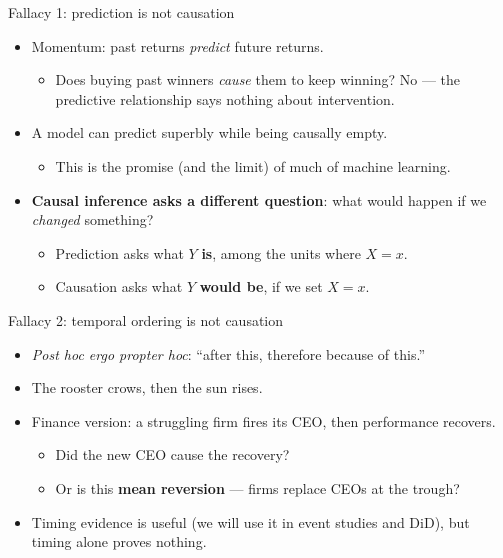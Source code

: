 \documentclass[
  11pt,
  ignorenonframetext,
  aspectratio=169,
]{beamer}
\providecommand{\tightlist}{%
  \setlength{\itemsep}{0pt}\setlength{\parskip}{0pt}}
\begin{document}
\begin{frame}{Fallacy 1: prediction is not causation}
\protect{}\label{fallacy-1-prediction-is-not-causation}
\begin{itemize}
\tightlist
\item
  Momentum: past returns \emph{predict} future returns.

  \begin{itemize}
  \tightlist
  \item
    Does buying past winners \emph{cause} them to keep winning? No ---
    the predictive relationship says nothing about intervention.
  \end{itemize}
\item
  A model can predict superbly while being causally empty.

  \begin{itemize}
  \tightlist
  \item
    This is the promise (and the limit) of much of machine learning.
  \end{itemize}
\item
  \textbf{Causal inference asks a different question}: what would happen
  if we \emph{changed} something?

  \begin{itemize}
  \tightlist
  \item
    Prediction asks what \(Y\) \textbf{is}, among the units where
    \(X = x\).
  \item
    Causation asks what \(Y\) \textbf{would be}, if we set \(X = x\).
  \end{itemize}
\end{itemize}
\end{frame}

\begin{frame}{Fallacy 2: temporal ordering is not causation}
\protect{}\label{fallacy-2-temporal-ordering-is-not-causation}
\begin{itemize}
\tightlist
\item
  \emph{Post hoc ergo propter hoc}: ``after this, therefore because of
  this.''
\item
  The rooster crows, then the sun rises.
\item
  Finance version: a struggling firm fires its CEO, then performance
  recovers.

  \begin{itemize}
  \tightlist
  \item
    Did the new CEO cause the recovery?
  \item
    Or is this \textbf{mean reversion} --- firms replace CEOs at the
    trough?
  \end{itemize}
\item
  Timing evidence is useful (we will use it in event studies and DiD),
  but timing alone proves nothing.
\end{itemize}
\end{frame}
\end{document}
